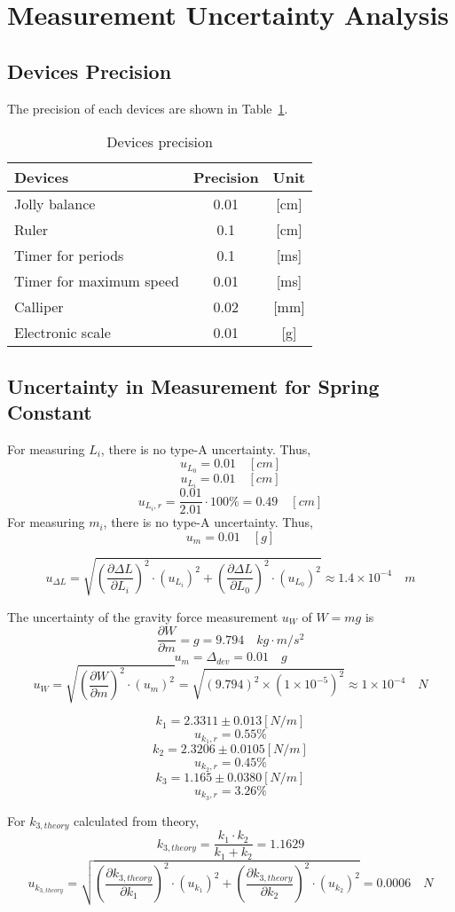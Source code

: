 \section{Measurement Uncertainty Analysis}

\subsection{Devices Precision}
The precision of each devices are shown in Table~\ref{pres}.
\begin{table}
	\centering
	\begin{tabular}{|l|c|c|}
	\hline
	Devices & Precision & Unit 				\\ \hline
	Jolly balance & 0.01 & [cm] 			\\ \hline
	Ruler & 0.1 & [cm]						\\ \hline
	Timer for periods & 0.1 & [ms]			\\ \hline
	Timer for maximum speed & 0.01 & [ms]	\\ \hline
	Calliper & 0.02 & [mm]					\\ \hline
	Electronic scale & 0.01 & [g]			\\ \hline
	\end{tabular}
	\caption{Devices precision}
\label{pres}
\end{table}

\subsection{Uncertainty in Measurement for Spring Constant}
For measuring $L_i$, there is no type-A uncertainty.
Thus, 
$$ u_{L_0} = 0.01 \quad [cm] $$
$$ u_{L_i} = 0.01 \quad [cm] $$
$$ u_{L_i,r} = \frac{0.01}{2.01} \cdot 100 \% = 0.49 \quad [cm] $$
For measuring $m_i$, there is no type-A uncertainty.
Thus, $$ u_m = 0.01 \quad [g] $$

$$ u_{\Delta L}=\sqrt{(\frac{\partial \Delta L}{\partial L_i})^2\cdot (u_{L_i})^2+(\frac{\partial \Delta L}{\partial L_0})^2\cdot (u_{L_0})^2}\approx1.4\times10^{-4} \quad m $$

The uncertainty of the gravity force measurement $u_{W}$ of $W=mg$ is
$$   \frac{\partial W}{\partial m} = g =9.794 \quad kg\cdot m/s^2        $$
$$   u_m = \Delta_{dev}=0.01 \quad g				                     $$
$$   u_{W} = \sqrt{(\frac{\partial W}{\partial m})^2 \cdot 
(u_m)^2} = \sqrt{ {(9.794)^2\times (1\times10^{-5})^2}} 
 \approx 1 \times10^{-4} \quad N										 $$


$$ k_1 = 2.3311 \pm 0.013 [N/m] $$
$$ u_{k_1,r} = 0.55 \% $$
$$ k_2 =  2.3206 \pm 0.0105 [N/m] $$
$$ u_{k_2,r} = 0.45 \% $$
$$ k_3 = 1.165 \pm 0.0380 [N/m] $$
$$ u_{k_3,r} = 3.26 \% $$

For $k_{3,theory}$  calculated from theory, 
$$ k_{3,theory} = \frac{k_1 \cdot k_2 }{k_1 + k_2} =  1.1629 $$ 
$$ u_{k_{3,theory}}=\sqrt{
	 (\frac{\partial k_{3,theory} }{\partial k_1})^2 \cdot (u_{k_1})^2
	+(\frac{\partial k_{3,theory} }{\partial k_2})^2 \cdot (u_{k_2})^2 }
	= 0.0006 \quad N  $$
